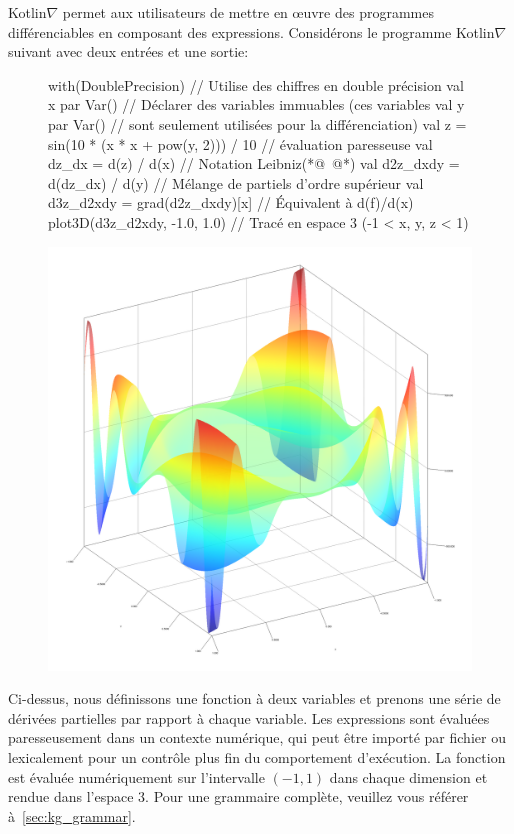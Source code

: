 Kotlin$\nabla$ permet aux utilisateurs de mettre en œuvre des programmes différenciables en composant des expressions. Considérons le programme Kotlin$\nabla$ suivant avec deux entrées et une sortie:
%
\begin{figure}[H] \label{fig:basic_kotlingrad}
\begin{unbreakablekotlin}
with(DoublePrecision) { // Utilise des chiffres en double précision
  val x par Var() // Déclarer des variables immuables (ces variables
  val y par Var() // sont seulement utilisées pour la différenciation)
  val z = sin(10 * (x * x + pow(y, 2))) / 10 // évaluation paresseuse
  val dz_dx = d(z) / d(x) // Notation Leibniz(*@~\citep{christianson2012leibniz}@*)
  val d2z_dxdy = d(dz_dx) / d(y) // Mélange de partiels d'ordre supérieur
  val d3z_d2xdy = grad(d2z_dxdy)[x] // Équivalent à d(f)/d(x)
  plot3D(d3z_d2xdy, -1.0, 1.0) // Tracé en espace 3 (-1 < x, y, z < 1)
}
\end{unbreakablekotlin}
\includegraphics[scale=0.43]{../figures/plot_result.png}
\end{figure}
%
Ci-dessus, nous définissons une fonction à deux variables et prenons une série de dérivées partielles par rapport à chaque variable. Les expressions sont évaluées paresseusement dans un contexte numérique, qui peut être importé par fichier ou lexicalement pour un contrôle plus fin du comportement d'exécution. La fonction est évaluée numériquement sur l'intervalle $(-1, 1)$ dans chaque dimension et rendue dans l'espace 3. Pour une grammaire complète, veuillez vous référer à~\autoref{sec:kg_grammar}.
